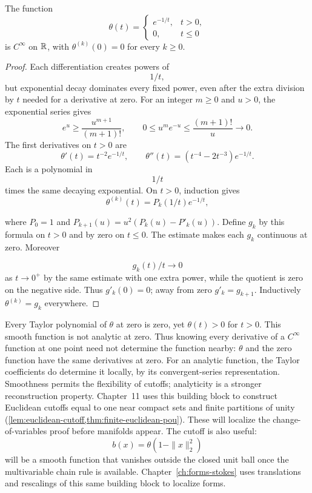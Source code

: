 \begin{theorem}
\label{thm:smooth-cutoff}
The function
\[
\theta(t)=\begin{cases}e^{-1/t},&t>0,\\0,&t\leq0\end{cases}
\]
is $C^\infty$ on $\mathbb{R}$, with $\theta^{(k)}(0)=0$ for every $k\geq0$.
\end{theorem}
\begin{proof}
Each differentiation creates powers of
\[
1/t,
\]
 but exponential
decay dominates every fixed power, even after the extra division by $t$
needed for a derivative at zero.
For an integer $m\geq0$ and $u>0$, the exponential series gives
\[
e^u\geq\frac{u^{m+1}}{(m+1)!},\qquad
0\leq u^me^{-u}\leq\frac{(m+1)!}{u}\longrightarrow0.
\]
The first derivatives on $t>0$ are
\[
\theta'(t)=t^{-2}e^{-1/t},\qquad
\theta''(t)=(t^{-4}-2t^{-3})e^{-1/t}.
\]
Each is a polynomial in
\[
1/t
\]
 times the same decaying exponential.
On $t>0$, induction gives
\[
\theta^{(k)}(t)=P_k(1/t)e^{-1/t},
\]

where $P_0=1$ and $P_{k+1}(u)=u^2(P_k(u)-P'_k(u))$.
Define $g_k$ by this formula on $t>0$ and by zero on $t\leq0$.
The estimate makes each $g_k$ continuous at zero. Moreover

\[
g_k(t)/t\to0
\]
 as $t\to0^+$ by the same estimate with one extra power,
while the quotient is zero on the negative side. Thus $g'_k(0)=0$;
away from zero $g'_k=g_{k+1}$. Inductively $\theta^{(k)}=g_k$ everywhere.
\end{proof}

Every Taylor polynomial of $\theta$ at zero is zero, yet $\theta(t)>0$
for $t>0$. This smooth function is not analytic at zero. Thus knowing
every derivative of a $C^\infty$ function at one point need not determine
the function nearby: $\theta$ and the zero function have the same derivatives
at zero. For an analytic function, the Taylor coefficients do determine it
locally, by its convergent-series representation. Smoothness permits the
flexibility of cutoffs; analyticity is a stronger reconstruction property.
Chapter~11 uses this building block to construct Euclidean cutoffs equal
to one near compact sets and finite partitions of unity
(\cref{lem:euclidean-cutoff,thm:finite-euclidean-pou}). These will localize
the change-of-variables proof before manifolds appear.
The cutoff is also useful:
\[
b(x)=\theta(1-\|x\|_2^2)
\]
will be a smooth function that vanishes outside the closed unit ball once the
multivariable chain rule is available. Chapter~\ref{ch:forms-stokes} uses
translations and rescalings of this same building block to localize forms.

